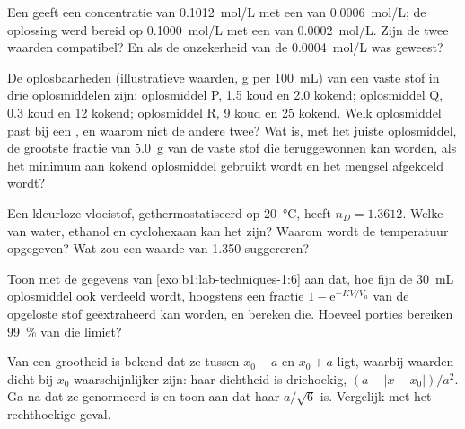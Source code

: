 \begin{exercise}[$\star\star$]\label{exo:b1:lab-techniques-1:7}
Een  geeft een concentratie van \qty{0.1012}{mol/L} met een
 van \qty{0.0006}{mol/L}; de oplossing werd bereid op
\qty{0.1000}{mol/L} met een  van \qty{0.0002}{mol/L}.
Zijn de twee waarden compatibel? En als de onzekerheid van de 
\qty{0.0004}{mol/L} was geweest?
\end{exercise}

\begin{exercise}[$\star\star$]\label{exo:b1:lab-techniques-1:8}
De oplosbaarheden (illustratieve waarden, \unit{g} per \qty{100}{mL}) van
een vaste stof in drie oplosmiddelen zijn: oplosmiddel P, 1.5 koud en 2.0
kokend; oplosmiddel Q, 0.3 koud en 12 kokend; oplosmiddel R, 9 koud en 25
kokend. Welk oplosmiddel past bij een , en waarom niet de
andere twee? Wat is, met het juiste oplosmiddel, de grootste fractie van
\qty{5.0}{g} van de vaste stof die teruggewonnen kan worden, als het
minimum aan kokend oplosmiddel gebruikt wordt en het mengsel afgekoeld
wordt?
\end{exercise}

\begin{exercise}[$\star\star$]\label{exo:b1:lab-techniques-1:9}
Een kleurloze vloeistof, gethermostatiseerd op \qty{20}{\celsius}, heeft
$n_D = 1.3612$. Welke van water, ethanol en cyclohexaan kan het zijn?
Waarom wordt de temperatuur opgegeven? Wat zou een waarde van 1.350
suggereren?
\end{exercise}

\begin{exercise}[$\star\star\star$]\label{exo:b1:lab-techniques-1:10}
Toon met de gegevens van \cref{exo:b1:lab-techniques-1:6} aan dat, hoe
fijn de \qty{30}{mL} oplosmiddel ook verdeeld wordt, hoogstens een fractie
$1 - \mathrm{e}^{-KV/V_a}$ van de opgeloste stof geëxtraheerd kan worden,
en bereken die. Hoeveel porties bereiken \qty{99}{\percent} van die
limiet?
\end{exercise}

\begin{exercise}[$\star\star\star$]\label{exo:b1:lab-techniques-1:11}
Van een grootheid is bekend dat ze tussen $x_0 - a$ en $x_0 + a$ ligt,
waarbij waarden dicht bij $x_0$ waarschijnlijker zijn: haar dichtheid is
driehoekig, $(a - |x - x_0|)/a^2$. Ga na dat ze genormeerd is en toon aan
dat haar  $a/\sqrt6$ is. Vergelijk met het
rechthoekige geval.
\end{exercise}

